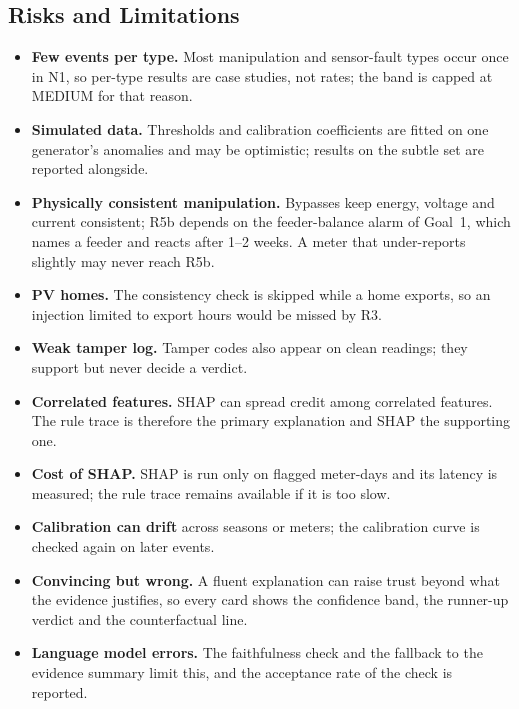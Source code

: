 \documentclass[11pt,a4paper]{article}
\begin{document}
\subsection{Risks and Limitations}
\label{sec:risks}
\begin{itemize}[leftmargin=*,itemsep=2pt]
  \item \textbf{Few events per type.} Most manipulation and sensor-fault types occur once in N1, so
        per-type results are case studies, not rates; the \SD{} band is capped at MEDIUM for that reason.
  \item \textbf{Simulated data.} Thresholds and calibration coefficients are fitted on one generator's
        anomalies and may be optimistic; results on the subtle set are reported alongside.
  \item \textbf{Physically consistent manipulation.} Bypasses keep energy, voltage and current consistent;
        R5b depends on the feeder-balance alarm of Goal~1, which names a feeder and reacts after 1--2 weeks. A
        meter that under-reports slightly may never reach R5b.
  \item \textbf{PV homes.} The consistency check is skipped while a home exports, so an injection limited to
        export hours would be missed by R3.
  \item \textbf{Weak tamper log.} Tamper codes also appear on clean readings; they support but never decide
        a verdict.
  \item \textbf{Correlated features.} SHAP can spread credit among correlated features. The rule trace is
        therefore the primary explanation and SHAP the supporting one.
  \item \textbf{Cost of SHAP.} SHAP is run only on flagged meter-days and its latency is measured; the rule
        trace remains available if it is too slow.
  \item \textbf{Calibration can drift} across seasons or meters; the calibration curve is checked again on
        later events.
  \item \textbf{Convincing but wrong.} A fluent explanation can raise trust beyond what the evidence
        justifies, so every card shows the confidence band, the runner-up verdict and the counterfactual line.
  \item \textbf{Language model errors.} The faithfulness check and the fallback to the evidence summary
        limit this, and the acceptance rate of the check is reported.
\end{itemize}
\end{document}

